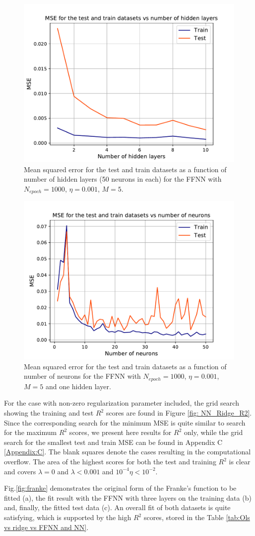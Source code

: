 \documentclass{emulateapj}
\begin{document}
\begin{figure}[h]
    \centering
    \includegraphics[width=.49\textwidth]{Figures/NN_MSE_layers.pdf}
    \caption{Mean squared error for the test and train datasets as a function of number of hidden layers (50 neurons in each) for the FFNN with $N_{epoch}=1000$, $\eta=0.001$, $M=5$.}
    \label{fig: NN_MSE_layers}
\end{figure}

\begin{figure}[h]
    \centering
    \includegraphics[width=.49\textwidth]{Figures/NN_MSE_neurons.pdf}
    \caption{Mean squared error for the test and train datasets as a function of number of neurons for the FFNN with $N_{epoch}=1000$, $\eta=0.001$, $M=5$ and one hidden layer.}
    \label{fig: NN_MSE_neurons}
\end{figure}

For the case with non-zero regularization parameter included, the grid search showing the training and test $R^{2}$ scores are found in Figure \ref{fig: NN_Ridge_R2}. Since the corresponding search for the minimum MSE is quite similar to search for the maximum $R^{2}$ scores, we present here results for $R^{2}$ only, while the grid search for the smallest test and train MSE can be found in Appendix C \ref{Appendix:C}. The blank squares denote the cases resulting in the computational overflow. The area of the highest scores for both the test and training $R^{2}$ is clear and covers $\lambda=0$ and $\lambda<0.001$ and $10^{-4}\eta<10^{-2}$.

Fig.\ref{fig:franke} demonstrates the original form of the Franke's function to be fitted (a), the fit result with the FFNN with three layers on the training data (b) and, finally, the fitted test data (c). An overall fit of both datasets is quite satisfying, which is supported by the high $R^2$ scores, stored in the Table \ref{tab:Ols vs ridge vs FFNN and NN}.
\end{document}

